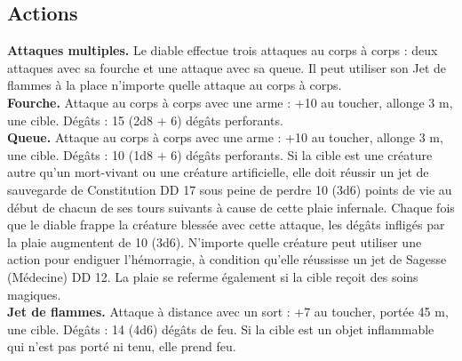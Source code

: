 \begin{figure*}[hb!]
{\begin{minipage}[c]{.45\linewidth}
    \subsection*{Actions}
    {\bfseries Attaques multiples.} Le diable effectue trois attaques au corps à corps : deux attaques avec sa fourche et une attaque avec sa queue. Il peut utiliser son Jet de flammes à la place n'importe quelle attaque au corps à corps. \\
    {\bfseries Fourche.} Attaque au corps à corps avec une arme : +10 au toucher, allonge 3 m, une cible. Dégâts : 15 (2d8 + 6) dégâts perforants. \\
    {\bfseries Queue.} Attaque au corps à corps avec une arme : +10 au toucher, allonge 3 m, une cible. Dégâts : 10 (1d8 + 6) dégâts perforants. Si la cible est une créature autre qu'un mort-vivant ou une créature artificielle, elle doit réussir un jet de sauvegarde de Constitution DD 17 sous peine de perdre 10 (3d6) points de vie au début de chacun de ses tours suivants à cause de cette plaie infernale. Chaque fois que le diable frappe la créature blessée avec cette attaque, les dégâts infligés par la plaie augmentent de 10 (3d6). N'importe quelle créature peut utiliser une action pour endiguer l'hémorragie, à condition qu'elle réussisse un jet de Sagesse (Médecine) DD 12. La plaie se referme également si la cible reçoit des soins magiques. \\
    {\bfseries Jet de flammes.} Attaque à distance avec un sort : +7 au toucher, portée 45 m, une cible. Dégâts : 14 (4d6) dégâts de feu. Si la cible est un objet inflammable qui n'est pas porté ni tenu, elle prend feu.
  \end{minipage}
}%
\end{figure*}

